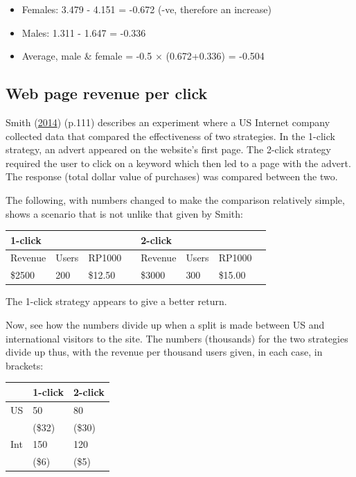 \documentclass[
  10pt,
  b5paper]{book}
\providecommand{\tightlist}{%
  \setlength{\itemsep}{0pt}\setlength{\parskip}{0pt}}
\begin{document}
\begin{itemize}
\tightlist
\item
  Females: 3.479 - 4.151 = -0.672 (-ve, therefore an increase)
\item
  Males: 1.311 - 1.647 = -0.336
\item
  Average, male \& female = -0.5 \(\times\) (0.672+0.336) = -0.504
\end{itemize}

\hypertarget{web-page-revenue-per-click}{%
\subsection*{Web page revenue per click}\label{web-page-revenue-per-click}}

Smith (\protect\hyperlink{ref-smith-sd}{2014}) (p.111) describes an experiment where a US Internet company collected data that compared the effectiveness of two strategies. In the 1-click strategy, an advert appeared on the website's first page. The 2-click strategy required the user to click on a keyword which then led to a page with the advert. The response (total dollar value of purchases) was compared between the two.

The following, with numbers changed to make the comparison relatively simple, shows a scenario that is not unlike that given by Smith:

\begin{longtable}[]{@{}llllllll@{}}
\toprule\noalign{}
1-click & & & & 2-click & & & \\
\midrule\noalign{}
\endhead
\bottomrule\noalign{}
\endlastfoot
Revenue & Users & RP1000 & & Revenue & Users & RP1000 & \\
\$2500 & 200 & \$12.50 & & \$3000 & 300 & \$15.00 & \\
\end{longtable}

The 1-click strategy appears to give a better return.

Now, see how the numbers divide up when a split is made between US and international visitors to the site. The numbers (thousands) for the two strategies divide up thus, with the revenue per thousand users given, in each case, in brackets:

\begin{longtable}[]{@{}lll@{}}
\toprule\noalign{}
& 1-click & 2-click \\
\midrule\noalign{}
\endhead
\bottomrule\noalign{}
\endlastfoot
US & 50 & 80 \\
& (\$32) & (\$30) \\
Int & 150 & 120 \\
& (\$6) & (\$5) \\
\end{longtable}
\end{document}
